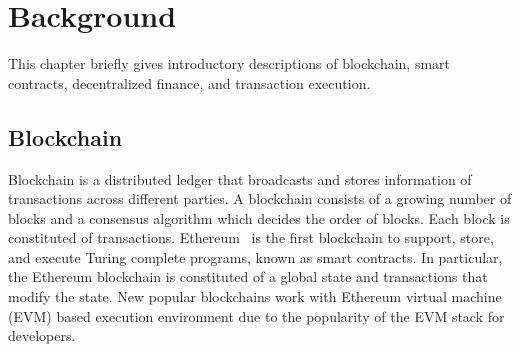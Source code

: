 \chapter{Background}
\label{sec:background}

This chapter briefly gives introductory descriptions of blockchain, smart
contracts, decentralized finance, and transaction execution.


\section{Blockchain}


Blockchain is a distributed ledger that broadcasts and stores information of
transactions across different parties. 
A blockchain consists of a growing
number of blocks and a consensus algorithm which decides the order of blocks.
Each block is constituted of transactions.
Ethereum~\cite{ethereum22,buterin2014ethereum} is the first blockchain to
support, store, and execute Turing complete programs, known as smart contracts.
In particular, the Ethereum blockchain is constituted of a global state and
transactions that modify the state. 
New popular blockchains
work with Ethereum virtual machine (EVM) based execution environment due to the
popularity of the EVM stack for developers. 





